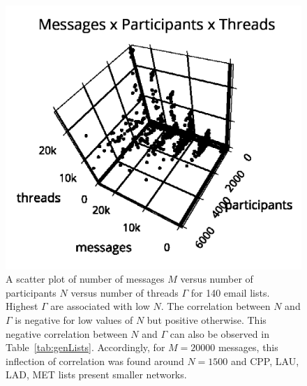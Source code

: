 \documentclass[%
	aip,
	jmp,%
	amsmath,amssymb,
	reprint,%
]{revtex4-1}
\begin{document}
\begin{figure}
   \centering
   \includegraphics[trim={0 0 0 1cm},clip,width=.7\columnwidth]{figs/mpgamma2}
	\caption{A scatter plot of number of messages $M$ versus number of participants $N$ versus number of threads $\Gamma$ for 140 email lists.
Highest $\Gamma$ are associated with low $N$.
The correlation between $N$ and $\Gamma$ is negative for low values of $N$ but positive otherwise.
This negative correlation between $N$ and $\Gamma$ can also be observed in Table~\ref{tab:genLists}.
Accordingly,
for $M=20000$ messages, this inflection
of correlation 
was found around $N=1500$
and CPP, LAU, LAD, MET lists 
present smaller networks.}
	\label{fig:nmgamma3d}
\end{figure}
\end{document}

